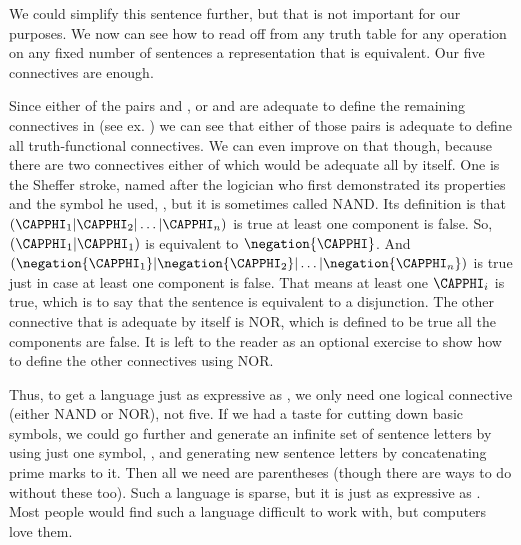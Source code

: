 \begin{PROOF}
\begin{menumerate}
\end{menumerate}
We could simplify this sentence further, but that is not important for our purposes. 
We now can see how to read off from any truth table for any operation on any fixed number of sentences a  representation that is equivalent. 
Our five connectives are enough. 
\end{PROOF}

Since either of the pairs \mention{$\NEGATION$} and \mention{$\!\WEDGE\!$}, or \mention{$\NEGATION$} and \mention{$\VEE$} are adequate to define the remaining connectives in \GSL{} (see ex. ) we can see that either of those pairs is adequate to define all truth-functional connectives.
We can even improve on that though, because there are two connectives either of which would be adequate all by itself. 
One is the Sheffer stroke, named after the logician who first demonstrated its properties and the symbol he used, \mention{|}, but it is sometimes called NAND. 
Its definition is that $(\CAPPHI_1|\CAPPHI_2|\ldots|\CAPPHI_{\integer{n}})$ is true \Iff at least one component is false. So, $(\CAPPHI_1|\CAPPHI_1)$ is equivalent to $\negation{\CAPPHI}$. 
And $(\negation{\CAPPHI_1}|\negation{\CAPPHI_2}|\ldots|\negation{\CAPPHI_{\integer{n}}})$ is true just in case at least one component is false. That means at least one $\CAPPHI_i$ is true, which is to say that the sentence is equivalent to a disjunction. 
The other connective that is adequate by itself is NOR, which is defined to be true \Iff all the components are false. It is left to the reader as an optional exercise to show how to define the other connectives using NOR. 

Thus, to get a language just as expressive as \GSL{}, we only need one logical connective (either NAND or NOR), not five. 
If we had a taste for cutting down basic symbols, we could go further and generate an infinite set of sentence letters by using just one symbol, \mention{$\Al$}, and generating new sentence letters by concatenating prime marks  to it. 
Then all we need are parentheses (though there are ways to do without these too). 
Such a language is sparse, but it is just as expressive as \GSL{}.  Most people would find such a language difficult to work with, but computers love them.



